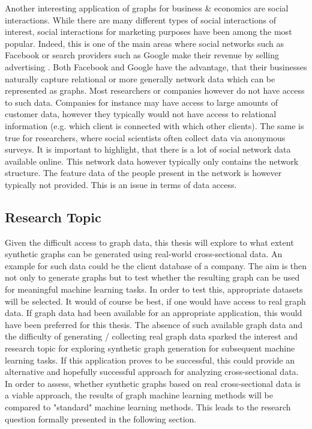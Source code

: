 	\noindent Another interesting application of graphs for business \& 
	economics are social interactions. While there are many different types of
	social interactions of interest, social interactions for marketing
	purposes have been among the most popular. Indeed, this is one of the main
	areas where social networks such as Facebook or search providers such as 
	Google make their revenue by selling advertising 
	\citep{Facebook2021,Alphabet2021}. Both Facebook and Google have the advantage, 
	that their businesses naturally capture relational or more generally network 
	data which can be represented as graphs. Most researchers or companies however 
	do not have access to such data. Companies for instance may have access to large
	amounts of customer data, however they typically would not have access to
	relational information (e.g. which client is connected with which other
	clients). The same is true for researchers, where social scientists
	often collect data via anonymous surveys. It is important to
	highlight, that there is a lot of social network data available online. 
	This network data however typically only contains the network structure. 
	The feature data of the people present in the network is however typically not
	provided. This is an issue in terms of data access. \\
	
	\subsection{Research Topic}

	\noindent Given the difficult access to graph data, this thesis will
	explore to what extent synthetic graphs can be generated using real-world
	cross-sectional data. An example for such data could be the client database
	of a company. The aim is then not only to generate graphs but to test 
	whether the resulting graph can be used for meaningful machine learning tasks. 
	In order to test this, appropriate datasets will be selected. It would of 
	course be best, if one would have access to real graph data. If graph data 
	had been available for an appropriate application, this would have been 
	preferred for this thesis. The absence of such available graph data and the 
	difficulty of generating / collecting real graph data sparked the interest 
	and research topic for exploring synthetic graph generation for subsequent 
	machine learning tasks. If this application proves to be successful, this 
	could provide an alternative and hopefully successful approach for analyzing 
	cross-sectional data. In order to assess, whether synthetic graphs based on real
	cross-sectional data is a viable approach, the results of graph machine
	learning methods will be compared to "standard" machine learning methods.
	This leads to the research question formally presented in the following
	section.

